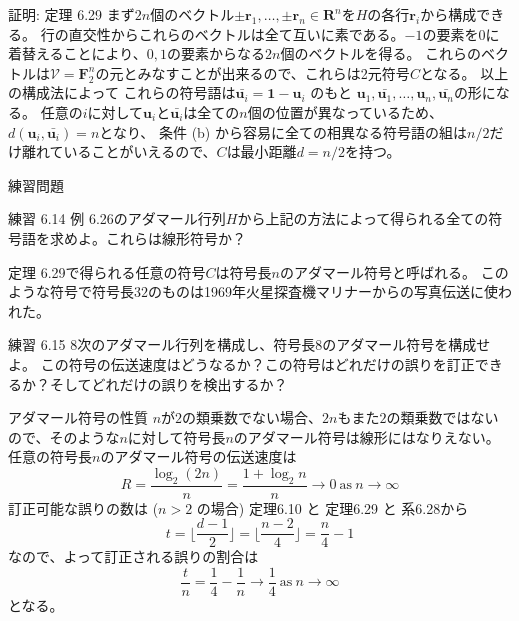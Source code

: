 \documentclass[dvipdfmx,10pt,jsarticle]{beamer}
\begin{document}
  \begin{frame}{証明: 定理 6.29}
        まず$2n$個のベクトル$\pm\mathbf{r}_1 , \ldots , \pm\mathbf{r}_n \in \mathbf{R}^n$を$H$の各行$\mathbf{r}_i$から構成できる。
        行の直交性からこれらのベクトルは全て互いに素である。$-1$の要素を$0$に着替えることにより、$0, 1$の要素からなる$2n$個のベクトルを得る。
        これらのベクトルは$\mathcal{V} = \mathbf{F}_2^n$の元とみなすことが出来るので、これらは2元符号$C$となる。
        以上の構成法によって
        これらの符号語は$\bar{\mathbf{u}_i} = \mathbf{1} - \mathbf{u}_i$ のもと $\mathbf{u}_1, \bar{\mathbf{u}_1}, \ldots , \mathbf{u}_n, \bar{\mathbf{u}_n}$の形になる。
        任意の$i$に対して$\mathbf{u}_i$と$\bar{\mathbf{u}_i}$は全ての$n$個の位置が異なっているため、$d(\mathbf{u}_i, \bar{\mathbf{u}_i}) = n$となり、
        条件 (b) から容易に全ての相異なる符号語の組は$n/2$だけ離れていることがいえるので、$C$は最小距離$d = n / 2$を持つ。
  \end{frame}

  \begin{frame}{練習問題}
        \begin{block}{練習 6.14}
          例 6.26のアダマール行列$H$から上記の方法によって得られる全ての符号語を求めよ。これらは線形符号か？ \\
        \end{block}

    定理 6.29で得られる任意の符号$C$は符号長$n$のアダマール符号と呼ばれる。
    このような符号で符号長$32$のものは1969年火星探査機マリナーからの写真伝送に使われた。

        \begin{block}{練習 6.15}
          $8$次のアダマール行列を構成し、符号長$8$のアダマール符号を構成せよ。
          この符号の伝送速度はどうなるか？この符号はどれだけの誤りを訂正できるか？そしてどれだけの誤りを検出するか？ \\
        \end{block}
  \end{frame}

  \begin{frame}{アダマール符号の性質}
    $n$が$2$の類乗数でない場合、$2n$もまた$2$の類乗数ではないので、そのような$n$に対して符号長$n$のアダマール符号は線形にはなりえない。
    任意の符号長$n$のアダマール符号の伝送速度は
    \[ R = \frac{\log_2 (2n)}{n} = \frac{1 + \log_2 n}{n} \rightarrow 0 \ \text{as} \ n \rightarrow \infty \]
    訂正可能な誤りの数は ($n > 2$ の場合) 定理6.10 と 定理6.29 と 系6.28から
    \[t = \lfloor \frac{d-1}{2} \rfloor = \lfloor \frac{n -2}{4} \rfloor = \frac n4 - 1 \]
    なので、よって訂正される誤りの割合は
    \[ \frac tn = \frac 14 - \frac 1n \rightarrow \frac 14 \ \text{as} \ n \rightarrow \infty \]
    となる。
  \end{frame}
\end{document}
